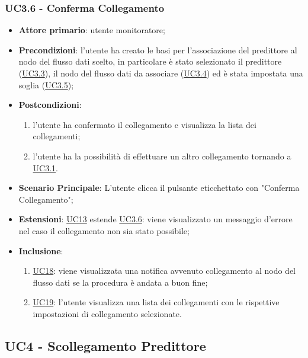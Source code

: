 	\subsubsection{UC3.6 - Conferma Collegamento}
		\begin{itemize}
			\item\textbf{Attore primario}: utente monitoratore;
			\item\textbf{Precondizioni}: l’utente ha creato le basi per l'associazione del predittore al nodo del flusso dati scelto, in particolare è stato selezionato il predittore (\hyperref[par:UC3.3]{UC3.3}), il nodo del flusso dati da associare (\hyperref[par:UC3.4]{UC3.4}) ed è stata impostata una soglia (\hyperref[par:UC3.5]{UC3.5});
			\item\textbf{Postcondizioni}: 
				\begin{enumerate}
					\item l’utente ha confermato il collegamento e visualizza la lista dei collegamenti;
					\item l'utente ha la possibilità di effettuare un altro collegamento tornando a \hyperref[par:UC3.1]{UC3.1}.
				\end{enumerate}
			\item\textbf{Scenario Principale}: L’utente clicca il pulsante eticchettato con "Conferma Collegamento";
			\item\textbf{Estensioni}: \hyperref[par:UC13]{UC13} estende \hyperref[par:UC3.6]{UC3.6}: viene visualizzato un messaggio d’errore nel caso il collegamento non sia stato possibile;
			\item\textbf{Inclusione}: 
				\begin{enumerate}
					\item\hyperref[par:UC18]{UC18}: viene visualizzata una notifica avvenuto collegamento al nodo del flusso dati se la procedura è andata a buon fine;
					\item\hyperref[par:UC19]{UC19}: l'utente visualizza una lista dei collegamenti con le rispettive impostazioni di collegamento selezionate.
				\end{enumerate}
		\end{itemize}

	

	\label{par:UC4}
	\subsection{UC4 - Scollegamento Predittore}

